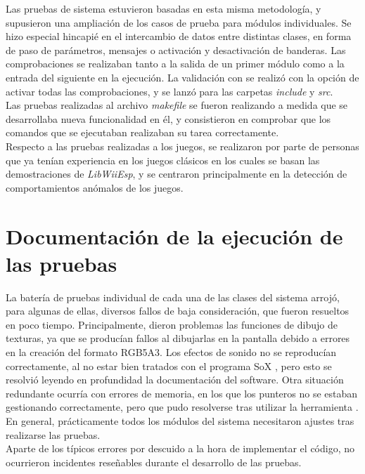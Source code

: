 Las pruebas de sistema estuvieron basadas en esta misma metodología, y supusieron una ampliación de los casos de prueba para módulos individuales. Se hizo especial hincapié en el intercambio de datos entre distintas clases, en forma de paso de parámetros, mensajes o activación y desactivación de banderas. Las comprobaciones se realizaban tanto a la salida de un primer módulo como a la entrada del siguiente en la ejecución. La validación con  se realizó con la opción de activar todas las comprobaciones, y se lanzó para las carpetas \emph{include} y \emph{src}.\\

Las pruebas realizadas al archivo \emph{makefile} se fueron realizando a medida que se desarrollaba nueva funcionalidad en él, y consistieron en comprobar que los comandos que se ejecutaban realizaban su tarea correctamente.\\

Respecto a las pruebas realizadas a los juegos, se realizaron por parte de personas que ya tenían experiencia en los juegos clásicos en los cuales se basan las demostraciones de \emph{LibWiiEsp}, y se centraron principalmente en la detección de comportamientos anómalos de los juegos.

\section{Documentación de la ejecución de las pruebas}

La batería de pruebas individual de cada una de las clases del sistema arrojó, para algunas de ellas, diversos fallos de baja consideración, que fueron resueltos en poco tiempo. Principalmente, dieron problemas las funciones de dibujo de texturas, ya que se producían fallos al dibujarlas en la pantalla debido a errores en la creación del formato RGB5A3. Los efectos de sonido no se reproducían correctamente, al no estar bien tratados con el programa SoX \cite{website:sox}, pero esto se resolvió leyendo en profundidad la documentación del software. Otra situación redundante ocurría con errores de memoria, en los que los punteros no se estaban gestionando correctamente, pero que pudo resolverse tras utilizar la herramienta . En general, prácticamente todos los módulos del sistema necesitaron ajustes tras realizarse las pruebas.\\

Aparte de los típicos errores por descuido a la hora de implementar el código, no ocurrieron incidentes reseñables durante el desarrollo de las pruebas.

